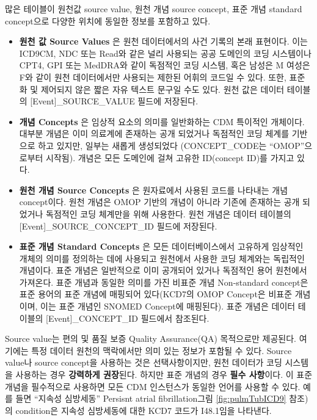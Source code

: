 \documentclass[10.5pt]{book}
\providecommand{\tightlist}{%
  \setlength{\itemsep}{0pt}\setlength{\parskip}{0pt}}
\theoremstyle{definition}
\theoremstyle{definition}
\theoremstyle{definition}
\theoremstyle{remark}
\begin{document}
많은 테이블이 원천값 source value, 원천 개념 source concept, 표준 개념
standard concept으로 다양한 위치에 동일한 정보를 포함하고 있다.

\begin{itemize}
\tightlist
\item
  \textbf{원천 값 Source Values} 은 원천 데이터에서의 사건 기록의 본래
  표현이다. 이는 ICD9CM, NDC 또는 Read와 같은 널리 사용되는 공공
  도메인의 코딩 시스템이나 CPT4, GPI 또는 MedDRA와 같이 독점적인 코딩
  시스템, 혹은 남성은 M 여성은 F와 같이 원천 데이터에서만 사용되는
  제한된 어휘의 코드일 수 있다. 또한, 표준화 및 제어되지 않은 짧은 자유
  텍스트 문구일 수도 있다. 원천 값은 데이터 테이블의
  {[}Event{]}\_SOURCE\_VALUE 필드에 저장된다.
\item
  \textbf{개념 Concepts} 은 임상적 요소의 의미를 일반화하는 CDM 특이적인
  개체이다. 대부분 개념은 이미 의료계에 존재하는 공개 되었거나 독점적인
  코딩 체계를 기반으로 하고 있지만, 일부는 새롭게 생성되었다
  (CONCEPT\_CODE는 ``OMOP''으로부터 시작됨). 개념은 모든 도메인에 걸쳐
  고유한 ID(concept ID)를 가지고 있다.
\item
  \textbf{원천 개념 Source Concepts} 은 원자료에서 사용된 코드를
  나타내는 개념 concept이다. 원천 개념은 OMOP 기반의 개념이 아니라
  기존에 존재하는 공개 되었거나 독점적인 코딩 체계만을 위해 사용한다.
  원천 개념은 데이터 테이블의 {[}Event{]}\_SOURCE\_CONCEPT\_ID 필드에
  저장된다.
\item
  \textbf{표준 개념 Standard Concepts} 은 모든 데이터베이스에서 고유하게
  임상적인 개체의 의미를 정의하는 데에 사용되고 원천에서 사용한 코딩
  체계와는 독립적인 개념이다. 표준 개념은 일반적으로 이미 공개되어
  있거나 독점적인 용어 원천에서 가져온다. 표준 개념과 동일한 의미를 가진
  비표준 개념 Non-standard concept은 표준 용어의 표준 개념에 매핑되어
  있다(KCD7의 OMOP Concept은 비표준 개념이며, 이는 표준 개념인 SNOMED
  Concept에 매핑된다). 표준 개념은 데이터 테이블의
  {[}Event{]}\_CONCEPT\_ID 필드에서 참조된다.
\end{itemize}

Source value는 편의 및 품질 보증 Quality Assurance(QA) 목적으로만
제공된다. 여기에는 특정 데이터 원천의 맥락에서만 의미 있는 정보가 포함될
수 있다. Source value나 source concept을 사용하는 것은 선택사항이지만,
원천 데이터가 코딩 시스템을 사용하는 경우 \textbf{강력하게 권장}된다.
하지만 표준 개념의 경우 \textbf{필수 사항}이다. 이 표준 개념을
필수적으로 사용하면 모든 CDM 인스턴스가 동일한 언어를 사용할 수 있다.
예를 들면 ``지속성 심방세동'' Persisnt atrial fibrillation그림
\ref{fig:pulmTubICD9} 참조)의 condition은 지속성 심방세동에 대한 KCD7
코드가 I48.1임을 나타낸다.
\end{document}
